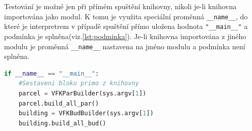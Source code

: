 Testování je možné jen při přímém spuštění knihovny, nikoli je-li knihovna importována jako modul. K tomu je využita speciální proměnná \verb|__name__|, do které je interpretrem v případě spuštění přímo uložena hodnota \verb|"__main__"| a podmínka je splněna(viz.\ref{lst:podminka}). Je-li knihovna importována z jiného modulu je proměnná \verb|__name__| nastavena na jméno modulu a podmínka není splněna.
\begin{lstlisting}[caption=Ukázka sestavení bloků provedeném jen při přímém spuštění knihovny, language=Python, numbers=none, label=lst:podminka]
if __name__ == "__main__":
	#Sestaveni bloku primo z knihovny
    parcel = VFKParBuilder(sys.argv[1])
    parcel.build_all_par()
    building = VFKBudBuilder(sys.argv[1])
    building.build_all_bud()
\end{lstlisting}
